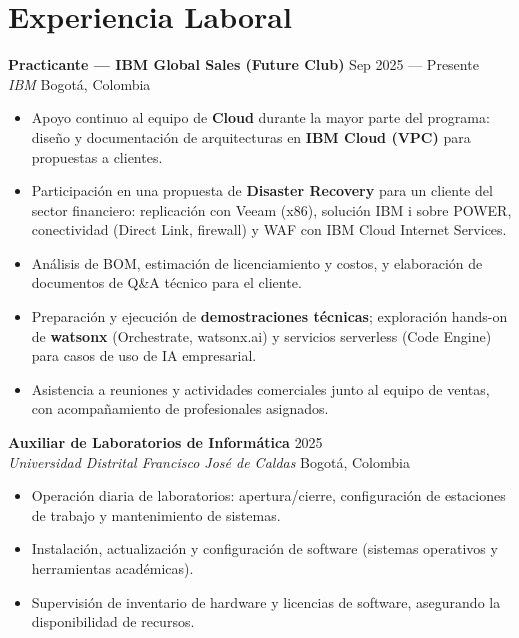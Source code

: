 \documentclass[11pt,a4paper]{article}
\newcommand{\cventry}[4]{%
  \textbf{\color{darktext}#1} \hfill {\small\color{graytext}#2} \\
  {\color{accent}\textit{#3}} \hfill {\small\color{graytext}#4}
  \vspace{4pt}
}
\begin{document}
\section{\faBriefcase\hspace{6pt}Experiencia Laboral}

\cventry{Practicante --- IBM Global Sales (Future Club)}{Sep 2025 --- Presente}{IBM}{Bogot\'a, Colombia}
\begin{itemize}[leftmargin=14pt, itemsep=1pt, topsep=0pt]
  \item Apoyo continuo al equipo de \textbf{Cloud} durante la mayor parte del programa: dise\~no y documentaci\'on de arquitecturas en \textbf{IBM Cloud (VPC)} para propuestas a clientes.
  \item Participaci\'on en una propuesta de \textbf{Disaster Recovery} para un cliente del sector financiero: replicaci\'on con Veeam (x86), soluci\'on IBM i sobre POWER, conectividad (Direct Link, firewall) y WAF con IBM Cloud Internet Services.
  \item An\'alisis de BOM, estimaci\'on de licenciamiento y costos, y elaboraci\'on de documentos de Q\&A t\'ecnico para el cliente.
  \item Preparaci\'on y ejecuci\'on de \textbf{demostraciones t\'ecnicas}; exploraci\'on hands-on de \textbf{watsonx} (Orchestrate, watsonx.ai) y servicios serverless (Code Engine) para casos de uso de IA empresarial.
  \item Asistencia a reuniones y actividades comerciales junto al equipo de ventas, con acompa\~namiento de profesionales asignados.
\end{itemize}
\vspace{5pt}

\cventry{Auxiliar de Laboratorios de Inform\'atica}{2025}{Universidad Distrital Francisco Jos\'e de Caldas}{Bogot\'a, Colombia}
\begin{itemize}[leftmargin=14pt, itemsep=1pt, topsep=0pt]
  \item Operaci\'on diaria de laboratorios: apertura/cierre, configuraci\'on de estaciones de trabajo y mantenimiento de sistemas.
  \item Instalaci\'on, actualizaci\'on y configuraci\'on de software (sistemas operativos y herramientas acad\'emicas).
  \item Supervisi\'on de inventario de hardware y licencias de software, asegurando la disponibilidad de recursos.
\end{itemize}
\vspace{5pt}
\end{document}

